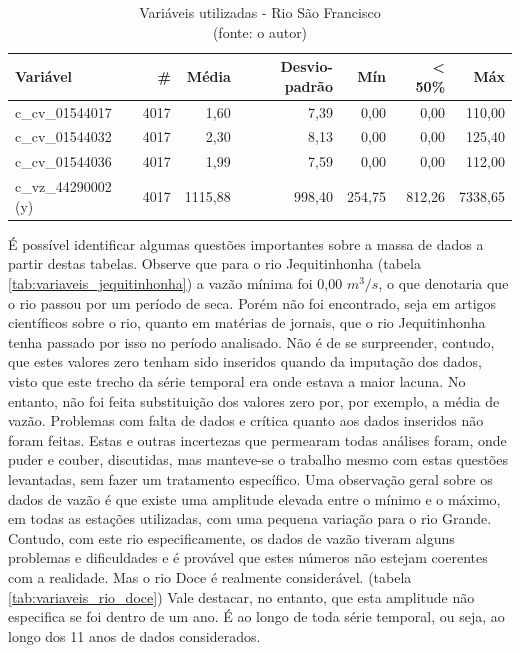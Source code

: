 \begin{table}[!h]
	\centering \small
	\caption{Variáveis utilizadas - Rio São Francisco \\(fonte: o autor)}
	\begin{tabular}{|l|r|r|r|r|r|r|} \hline 
		\textbf{Variável}   & \textbf{\#} & \textbf{Média} & \textbf{Desvio-padrão} & \textbf{Mín} & \textbf{< 50\%} & \textbf{Máx} \\\hline
		c\_cv\_01544017     & 4017        & 1,60           & 7,39                   & 0,00         & 0,00            & 110,00       \\\hline
		c\_cv\_01544032     & 4017        & 2,30           & 8,13                   & 0,00         & 0,00            & 125,40       \\\hline
		c\_cv\_01544036     & 4017        & 1,99           & 7,59                   & 0,00         & 0,00            & 112,00       \\\hline
		c\_vz\_44290002 (y) & 4017        & 1115,88        & 998,40                 & 254,75       & 812,26          & 7338,65      \\\hline
	\end{tabular}
	\label{tab:variaveis_rio_sao_francisco}
\end{table}
\clearpage

É possível identificar algumas questões importantes sobre a massa de dados a partir destas tabelas. Observe que para o rio Jequitinhonha (tabela \ref{tab:variaveis_jequitinhonha}) a vazão mínima foi 0,00 $m^3/s$, o que denotaria que o rio passou por um período de seca. Porém não foi encontrado, seja em artigos científicos sobre o rio, quanto em matérias de jornais, que o rio Jequitinhonha tenha passado por isso no período analisado. Não é de se surpreender, contudo, que estes valores zero tenham sido inseridos quando da imputação dos dados, visto que este trecho da série temporal era onde estava a maior lacuna. No entanto, não foi feita substituição dos valores zero por, por exemplo, a média de vazão. Problemas com falta de dados e crítica quanto aos dados inseridos não foram feitas. Estas e outras incertezas que permearam todas análises foram, onde puder e couber, discutidas, mas manteve-se o trabalho mesmo com estas questões levantadas, sem fazer um tratamento específico. Uma observação geral sobre os dados de vazão é que existe uma amplitude elevada entre o mínimo e o máximo, em todas as estações utilizadas, com uma pequena variação para o rio Grande. Contudo, com este rio especificamente, os dados de vazão tiveram alguns problemas e dificuldades e é provável que estes números não estejam coerentes com a realidade. Mas o rio Doce é realmente considerável. (tabela \ref{tab:variaveis_rio_doce}) Vale destacar, no entanto, que esta amplitude não especifica se foi dentro de um ano. É ao longo de toda série temporal, ou seja, ao longo dos 11 anos de dados considerados.

